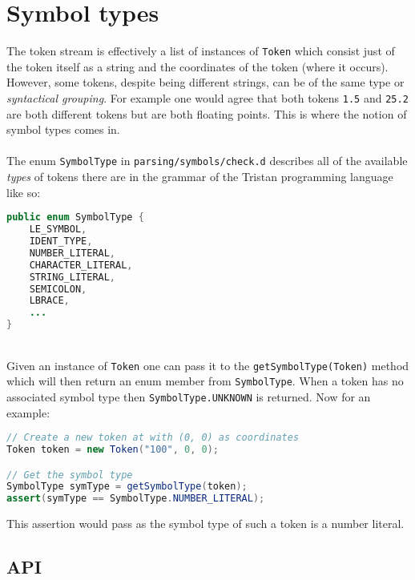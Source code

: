 \section{Symbol types}

The token stream is effectively a list of instances of \texttt{Token}
which consist just of the token itself as a string and the coordinates
of the token (where it occurs). However, some tokens, despite being
different strings, can be of the same type or \emph{syntactical grouping}.
For example one would agree that both tokens \texttt{1.5} and \texttt{25.2}
are both different tokens but are both floating points. This is where
the notion of symbol types comes in.\\
\\
The enum \texttt{SymbolType} in \texttt{parsing/symbols/check.d}
describes all of the available \emph{types }of tokens there are in
the grammar of the Tristan programming language like so:\begin{lstlisting}[language=Java]
public enum SymbolType {
	LE_SYMBOL,
	IDENT_TYPE,
	NUMBER_LITERAL,
	CHARACTER_LITERAL,
	STRING_LITERAL,
	SEMICOLON,
	LBRACE,
	...
}
\end{lstlisting}~\\
Given an instance of \texttt{Token} one can pass it to the \texttt{getSymbolType(Token)}
method which will then return an enum member from \texttt{SymbolType}.
When a token has no associated symbol type then \texttt{SymbolType.UNKNOWN}
is returned. Now for an example:\begin{lstlisting}[language=Java]
// Create a new token at with (0, 0) as coordinates
Token token = new Token("100", 0, 0);

// Get the symbol type
SymbolType symType = getSymbolType(token);
assert(symType == SymbolType.NUMBER_LITERAL);
\end{lstlisting}This assertion would pass as the symbol type of such a token is a
number literal.

\subsection{API}

